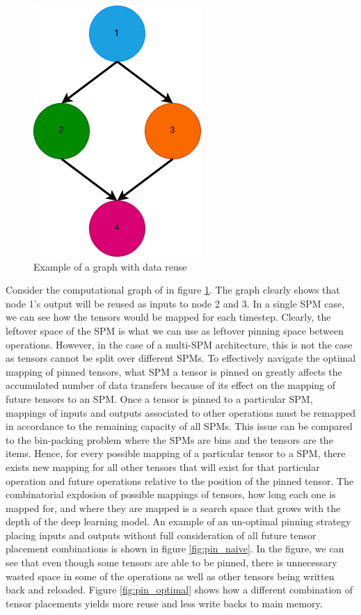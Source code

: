 
\begin{figure}[thb!]
\centering
\includegraphics[scale=0.7]{Figures/reuse_example_graph.png}
\decoRule
\caption[Example of a Graph with Data Reuse]{Example of a graph with data reuse}
\label{fig:reuseGraph}
\end{figure}

Consider the computational graph of in figure \ref{fig:reuseGraph}. The graph clearly shows that
node 1's output will be reused as inputs to node 2 and 3. In a single SPM case,
we can see how the tensors would be mapped for each timestep. Clearly, the
leftover space of the SPM is what we can use as leftover pinning space between
operations. However, in the case of a multi-SPM architecture, this is not the
case as tensors cannot be split over different SPMs. To effectively navigate
the optimal mapping of pinned tensors, what SPM a tensor is pinned on greatly
affects the accumulated number of data transfers because of its effect on the
mapping of future tensors to an SPM. Once a tensor is pinned to a particular
SPM, mappings of inputs and outputs associated to other operations must be
remapped in accordance to the remaining capacity of all SPMs. This issue can be
compared to the bin-packing problem where the SPMs are bins and the tensors are
the items. Hence, for every possible mapping of a particular tensor to a SPM,
there exists new mapping for all other tensors that will exist for that
particular operation and future operations relative to the position of the
pinned tensor. The combinatorial explosion of possible mappings of tensors,
how long each one is mapped for, and where they are mapped is a search space
that grows with the depth of the deep learning model. An example of 
an un-optimal pinning strategy placing inputs and outputs without full consideration
of all future tensor placement combinations is shown in figure \ref{fig:pin_naive}.
In the figure, we can see that even though some tensors are able to be pinned,
there is unnecessary wasted space in some of the operations as well as other tensors
being written back and reloaded. Figure \ref{fig:pin_optimal} shows how a different
combination of tensor placements yields more reuse and less write backs to main
memory.

